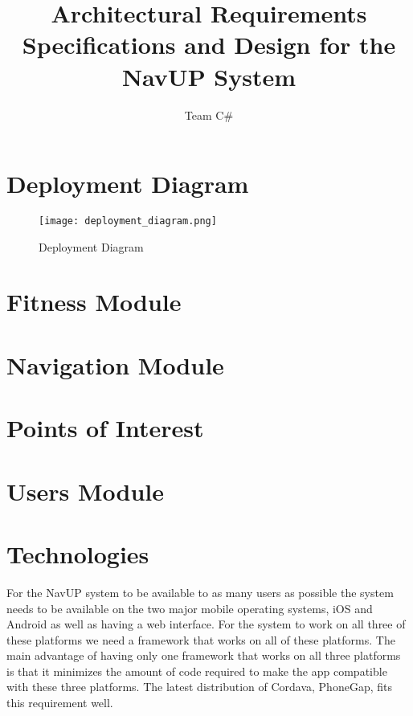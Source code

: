 \documentclass[11pt]{article}
\author{Team C\#}
\title{Architectural Requirements Specifications and Design for the NavUP System}
\begin{document}
	\setlength{\parskip}{6pt}
	
	
	
	\tableofcontents
	
	\newpage
	
	\section{Deployment Diagram}
	\begin{figure}[H]
		\centering
		\texttt{[image: deployment\_diagram.png]}
		\caption{Deployment Diagram}
		\label{fig:deployment_diagram}
	\end{figure}
	
	\newpage
	
	\section{Fitness Module}
	
	
	\newpage
	
	\section{Navigation Module}
	
	
	\newpage
	
	\section{Points of Interest}
	
	
	\newpage
	
	\section{Users Module}
	
	
	\newpage
	
	\section{Technologies}
	For the NavUP system to be available to as many users as possible the system needs to be available on the two major mobile operating systems, iOS and Android as well as having a web interface. For the system to work on all three of these platforms we need a framework that works on all of these platforms. The main advantage of having only one framework that works on all three platforms is that it minimizes the amount of code required to make the app compatible with these three platforms. The latest distribution of Cordava, PhoneGap, fits this requirement well.
	
\end{document}
